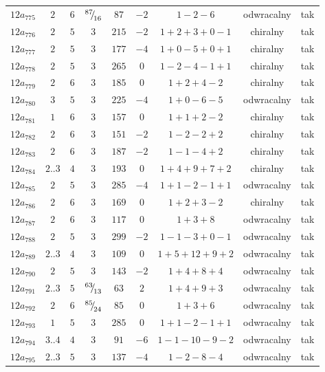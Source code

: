 \begin{longtable}{ccccccccc}
$12a_{775}$ & $2$ & $6$ & ${}^{87}{\mskip -5mu/\mskip -3mu}_{16}$ & $87$ & $-2$ & $1-2-6$ & odwracalny & tak \\
$12a_{776}$ & $2$ & $5$ & $3$ & $215$ & $-2$ & $1+2+3+0-1$ & chiralny & tak \\
$12a_{777}$ & $2$ & $5$ & $3$ & $177$ & $-4$ & $1+0-5+0+1$ & chiralny & tak \\
$12a_{778}$ & $2$ & $5$ & $3$ & $265$ & $0$ & $1-2-4-1+1$ & chiralny & tak \\
$12a_{779}$ & $2$ & $6$ & $3$ & $185$ & $0$ & $1+2+4-2$ & chiralny & tak \\
$12a_{780}$ & $3$ & $5$ & $3$ & $225$ & $-4$ & $1+0-6-5$ & odwracalny & tak \\
$12a_{781}$ & $1$ & $6$ & $3$ & $157$ & $0$ & $1+1+2-2$ & chiralny & tak \\
$12a_{782}$ & $2$ & $6$ & $3$ & $151$ & $-2$ & $1-2-2+2$ & chiralny & tak \\
$12a_{783}$ & $2$ & $6$ & $3$ & $187$ & $-2$ & $1-1-4+2$ & chiralny & tak \\
$12a_{784}$ & $2..3$ & $4$ & $3$ & $193$ & $0$ & $1+4+9+7+2$ & chiralny & tak \\
$12a_{785}$ & $2$ & $5$ & $3$ & $285$ & $-4$ & $1+1-2-1+1$ & odwracalny & tak \\
$12a_{786}$ & $2$ & $6$ & $3$ & $169$ & $0$ & $1+2+3-2$ & chiralny & tak \\
$12a_{787}$ & $2$ & $6$ & $3$ & $117$ & $0$ & $1+3+8$ & odwracalny & tak \\
$12a_{788}$ & $2$ & $5$ & $3$ & $299$ & $-2$ & $1-1-3+0-1$ & odwracalny & tak \\
$12a_{789}$ & $2..3$ & $4$ & $3$ & $109$ & $0$ & $1+5+12+9+2$ & odwracalny & tak \\
$12a_{790}$ & $2$ & $5$ & $3$ & $143$ & $-2$ & $1+4+8+4$ & odwracalny & tak \\
$12a_{791}$ & $2..3$ & $5$ & ${}^{63}{\mskip -5mu/\mskip -3mu}_{13}$ & $63$ & $2$ & $1+4+9+3$ & odwracalny & tak \\
$12a_{792}$ & $2$ & $6$ & ${}^{85}{\mskip -5mu/\mskip -3mu}_{24}$ & $85$ & $0$ & $1+3+6$ & odwracalny & tak \\
$12a_{793}$ & $1$ & $5$ & $3$ & $285$ & $0$ & $1+1-2-1+1$ & odwracalny & tak \\
$12a_{794}$ & $3..4$ & $4$ & $3$ & $91$ & $-6$ & $1-1-10-9-2$ & odwracalny & tak \\
$12a_{795}$ & $2..3$ & $5$ & $3$ & $137$ & $-4$ & $1-2-8-4$ & odwracalny & tak \\

\end{longtable}
